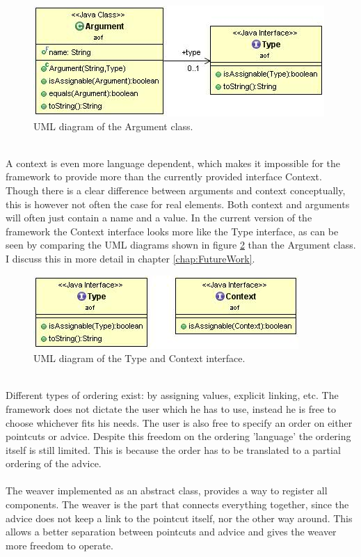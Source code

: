 \documentclass[a4paper]{report}
\begin{document}
\begin{figure}[h!]
\centering
\includegraphics[scale=0.7]{images/AOF/Argument.jpg}
\caption{UML diagram of the Argument class.}
\label{fig:Argument}
\end{figure}
\\
A context is even more language dependent, which makes it impossible for the framework to provide more than the currently provided interface Context. Though there is a clear difference between arguments and context conceptually, this is however not often the case for real elements. Both context and arguments will often just contain a name and a value. In the current version of the framework the Context interface looks more like the Type interface, as can be seen by comparing the UML diagrams shown in figure \ref{fig:Type-Context} than the Argument class. I discuss this in more detail in chapter \ref{chap:FutureWork}.\\
\begin{figure}[h!]
\centering
\includegraphics[scale=0.7]{images/AOF/Type-Context.jpg}
\caption{UML diagram of the Type and Context interface.}
\label{fig:Type-Context}
\end{figure}
\\
Different types of ordering exist: by assigning values, explicit linking, etc. The framework does not dictate the user which he has to use, instead he is free to choose whichever fits his needs. The user is also free to specify an order on either pointcuts or advice. Despite this freedom on the ordering 'language' the ordering itself is still limited. This is because the order has to be translated to a partial ordering of the advice.\\
\\
The weaver implemented as an abstract class, provides a way to register all components. The weaver is the part that connects everything together, since the advice does not keep a link to the pointcut itself, nor the other way around. This allows a better separation between pointcuts and advice and gives the weaver more freedom to operate.\\
\end{document}
